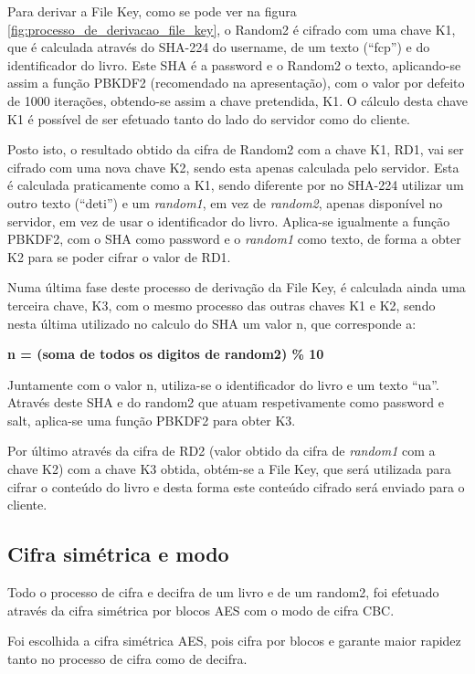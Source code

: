\documentclass[pdftex,12pt,a4paper]{report}
\begin{document}
Para derivar a File Key, como se pode ver na figura \ref{fig:processo_de_derivacao_file_key}, o Random2 é cifrado com uma chave K1, que é calculada através do SHA-224 do username, de um texto (“fcp”) e do identificador do livro. Este SHA é a password e o Random2 o texto, aplicando-se assim a função PBKDF2 (recomendado na apresentação), com o valor por defeito de 1000 iterações, obtendo-se assim a chave pretendida, K1. O cálculo desta chave K1 é possível de ser efetuado tanto do lado do servidor como do cliente.

Posto isto, o resultado obtido da cifra de Random2 com a chave K1, RD1, vai ser cifrado com uma nova chave K2, sendo esta apenas calculada pelo servidor. Esta é calculada praticamente como a K1, sendo diferente por no SHA-224 utilizar um outro texto (“deti”) e um \textit{random1}, em vez de \textit{random2}, apenas disponível no servidor, em vez de usar o identificador do livro. Aplica-se igualmente a função PBKDF2, com o SHA como password e o \textit{random1} como texto, de forma a obter K2 para se poder cifrar o valor de RD1.

Numa última fase deste processo de derivação da File Key, é calculada ainda uma terceira chave, K3, com o mesmo processo das outras chaves K1 e K2, sendo nesta última utilizado no calculo do SHA um valor n, que corresponde a:

\begin{center}
	\textbf{n = (soma de todos os digitos de random2) \% 10}
\end{center}

Juntamente com o valor n, utiliza-se o identificador do livro e um texto “ua”. Através deste SHA e do random2 que atuam respetivamente como password e salt, aplica-se uma função PBKDF2 para obter K3.

Por último através da cifra de RD2 (valor obtido da cifra de \textit{random1} com a chave K2) com a chave K3 obtida, obtém-se a File Key, que será utilizada para cifrar o conteúdo do livro e desta forma este conteúdo cifrado será enviado para o cliente.

\subsection{Cifra simétrica e modo}

Todo o processo de cifra e decifra de um livro e de um random2, foi efetuado através da cifra simétrica por blocos AES com o modo de cifra CBC.

Foi escolhida a cifra simétrica AES, pois cifra por blocos e garante maior rapidez tanto no processo de cifra como de decifra.
	
\end{document}
